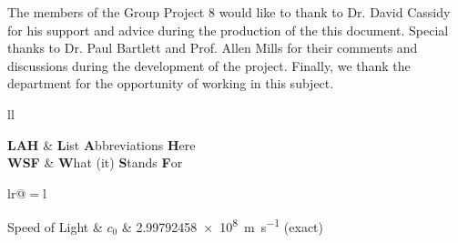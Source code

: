 \documentclass[11pt, english, singlespacing, headsepline,]{FinalReport}
\begin{document}

\begin{acknowledgements}
\addchaptertocentry{\acknowledgementname} %

The members of the Group Project 8 would like to thank to Dr. David Cassidy for his support and advice during the production of the this document. Special thanks to Dr. Paul Bartlett and Prof. Allen Mills for their comments and discussions during the development of the project. Finally, we thank the department for the opportunity of working in this subject.  

\end{acknowledgements}


\tableofcontents %

\listoffigures %

\listoftables %


\begin{abbreviations}{ll} %

\textbf{LAH} & \textbf{L}ist \textbf{A}bbreviations \textbf{H}ere\\
\textbf{WSF} & \textbf{W}hat (it) \textbf{S}tands \textbf{F}or\\

\end{abbreviations}


\begin{constants}{lr@{${}={}$}l} %


	Speed of Light & $c_{0}$ & \SI{2.99792458e8}{\meter\per\second} (exact)\\

\end{constants}
\end{document}
